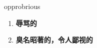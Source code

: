 
\begin{frame}
{\huge opprobrious}
\begin{center}
\begin{enumerate}\Large
  \item \textbf{辱骂的}
  \item \textbf{臭名昭著的，令人鄙视的}
\end{enumerate}
\end{center}
\end{frame}
